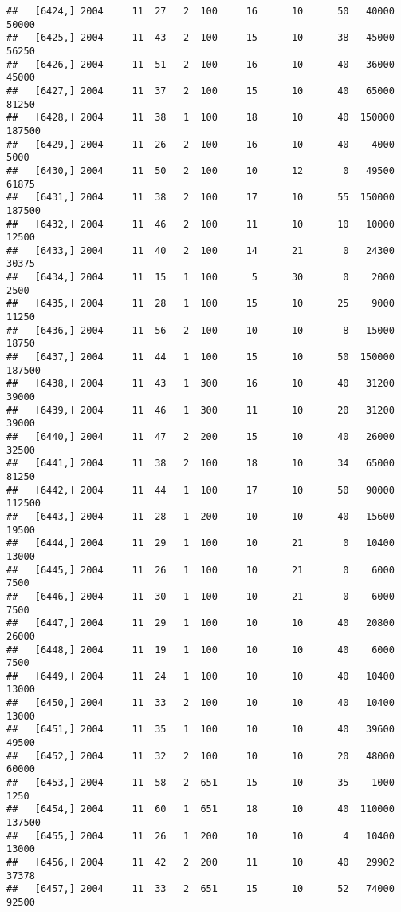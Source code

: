 \documentclass{article}\usepackage[]{graphicx}\usepackage[]{color}
\makeatletter
\newenvironment{kframe}{%
 \def\at@end@of@kframe{}%
 \ifinner\ifhmode%
  \def\at@end@of@kframe{\end{minipage}}%
  \begin{minipage}{\columnwidth}%
 \fi\fi%
 \def\FrameCommand##1{\hskip\@totalleftmargin \hskip-\fboxsep
 \colorbox{shadecolor}{##1}\hskip-\fboxsep
     \hskip-\linewidth \hskip-\@totalleftmargin \hskip\columnwidth}%
 \MakeFramed {\advance\hsize-\width
   \@totalleftmargin\z@ \linewidth\hsize
   \@setminipage}}%
 {\par\unskip\endMakeFramed%
 \at@end@of@kframe}
\newenvironment{knitrout}{}{} %
\makeatother
\begin{document}
\begin{knitrout}
\begin{kframe}
\begin{verbatim}
##   [6424,] 2004     11  27   2  100     16      10      50   40000   50000
##   [6425,] 2004     11  43   2  100     15      10      38   45000   56250
##   [6426,] 2004     11  51   2  100     16      10      40   36000   45000
##   [6427,] 2004     11  37   2  100     15      10      40   65000   81250
##   [6428,] 2004     11  38   1  100     18      10      40  150000  187500
##   [6429,] 2004     11  26   2  100     16      10      40    4000    5000
##   [6430,] 2004     11  50   2  100     10      12       0   49500   61875
##   [6431,] 2004     11  38   2  100     17      10      55  150000  187500
##   [6432,] 2004     11  46   2  100     11      10      10   10000   12500
##   [6433,] 2004     11  40   2  100     14      21       0   24300   30375
##   [6434,] 2004     11  15   1  100      5      30       0    2000    2500
##   [6435,] 2004     11  28   1  100     15      10      25    9000   11250
##   [6436,] 2004     11  56   2  100     10      10       8   15000   18750
##   [6437,] 2004     11  44   1  100     15      10      50  150000  187500
##   [6438,] 2004     11  43   1  300     16      10      40   31200   39000
##   [6439,] 2004     11  46   1  300     11      10      20   31200   39000
##   [6440,] 2004     11  47   2  200     15      10      40   26000   32500
##   [6441,] 2004     11  38   2  100     18      10      34   65000   81250
##   [6442,] 2004     11  44   1  100     17      10      50   90000  112500
##   [6443,] 2004     11  28   1  200     10      10      40   15600   19500
##   [6444,] 2004     11  29   1  100     10      21       0   10400   13000
##   [6445,] 2004     11  26   1  100     10      21       0    6000    7500
##   [6446,] 2004     11  30   1  100     10      21       0    6000    7500
##   [6447,] 2004     11  29   1  100     10      10      40   20800   26000
##   [6448,] 2004     11  19   1  100     10      10      40    6000    7500
##   [6449,] 2004     11  24   1  100     10      10      40   10400   13000
##   [6450,] 2004     11  33   2  100     10      10      40   10400   13000
##   [6451,] 2004     11  35   1  100     10      10      40   39600   49500
##   [6452,] 2004     11  32   2  100     10      10      20   48000   60000
##   [6453,] 2004     11  58   2  651     15      10      35    1000    1250
##   [6454,] 2004     11  60   1  651     18      10      40  110000  137500
##   [6455,] 2004     11  26   1  200     10      10       4   10400   13000
##   [6456,] 2004     11  42   2  200     11      10      40   29902   37378
##   [6457,] 2004     11  33   2  651     15      10      52   74000   92500

\end{verbatim}
\end{kframe}
\end{knitrout}
\end{document}
